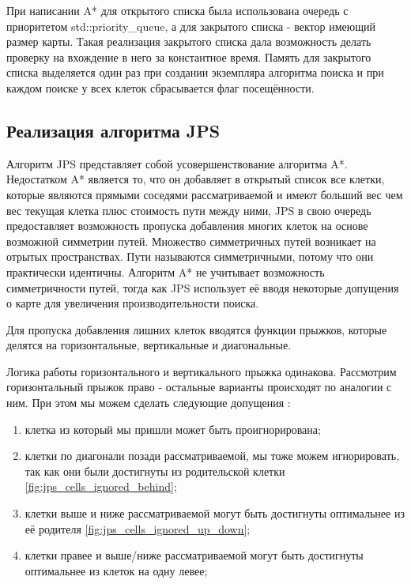 При написании A* для открытого списка была использована очередь с приоритетом std::priority\_queue, а для закрытого списка - вектор имеющий размер карты. Такая реализация закрытого списка дала возможность делать проверку на вхождение в него за константное время. Память для закрытого списка выделяется один раз при создании экземпляра алгоритма поиска и при каждом поиске у всех клеток сбрасывается флаг посещённости.

\subsection{Реализация алгоритма JPS}

Алгоритм JPS представляет собой усовершенствование алгоритма A*. Недостатком A* является то, что он добавляет в открытый список все клетки, которые являются прямыми соседями рассматриваемой и имеют больший вес чем вес текущая клетка плюс стоимость пути между ними, JPS в свою очередь предоставляет возможность пропуска добавления многих клеток на основе возможной симметрии путей. Множество симметричных путей возникает на отрытых пространствах. Пути называются симметричными, потому что они практически идентичны. Алгоритм A* не учитывает возможность симметричности путей, тогда как JPS использует её вводя некоторые допущения о карте для увеличения производительности поиска. 

Для пропуска добавления лишних клеток вводятся функции прыжков, которые делятся на горизонтальные, вертикальные и диагональные.

Логика работы горизонтального и вертикального прыжка одинакова. Рассмотрим горизонтальный прыжок право - остальные варианты происходят по аналогии с ним. При этом мы можем сделать следующие допущения \cite{JPS_DETAILS}:

\begin{enumerate}
    \item клетка из который мы пришли может быть проигнорирована;
    \item клетки по диагонали позади рассматриваемой, мы тоже можем игнорировать, так как они были достигнуты из родительской клетки \cref{fig:jps_cells_ignored_behind};
    \item клетки выше и ниже рассматриваемой могут быть достигнуты оптимальнее из её родителя \cref{fig:jps_cells_ignored_up_down};
    \item клетки правее и выше/ниже рассматриваемой могут быть достигнуты оптимальнее из клеток на одну левее;
\end{enumerate}

